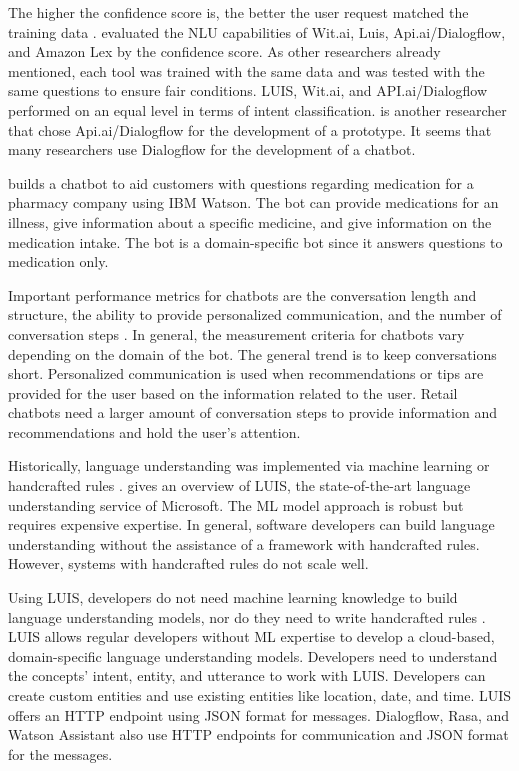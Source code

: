The higher the confidence score is, the better the user request matched the training data \cite{gregori2017evaluation}.
\citet{gregori2017evaluation} evaluated the NLU capabilities of Wit.ai, Luis, Api.ai/Dialogflow, and Amazon Lex\cite{lexconversational}
by the confidence score. 
As other researchers already mentioned, each tool was trained with the same data and was tested with the same questions to ensure fair conditions.
LUIS, Wit.ai, and API.ai/Dialogflow performed on an equal level in terms of intent classification.
\citet{gregori2017evaluation} is another researcher that chose Api.ai/Dialogflow for the development of a prototype.
It seems that many researchers use Dialogflow for the development of a chatbot.

\citet{pharmacybot} builds a chatbot to aid customers with questions regarding medication for a pharmacy company using IBM Watson.
The bot can provide medications for an illness, give information about a specific medicine, and give information on the medication intake.
The bot is a domain-specific bot since it answers questions to medication only.

Important performance metrics for chatbots are the conversation length and structure, the ability to provide personalized communication, and the number of conversation steps \cite{PRZEGALINSKA2019785}.
In general, the measurement criteria for chatbots vary depending on the domain of the bot.
The general trend is to keep conversations short.
Personalized communication is used when recommendations or tips are provided for the user based on the information related to the user.
Retail chatbots need a larger amount of conversation steps to provide information and recommendations and hold the user's attention.

Historically, language understanding was implemented via machine learning or handcrafted rules \cite{luis2015williams}.
\citet{luis2015williams} gives an overview of LUIS, the state-of-the-art language understanding service of Microsoft.
The ML model approach is robust but requires expensive expertise. 
In general, software developers can build language understanding without the assistance of a framework with handcrafted rules.
However, systems with handcrafted rules do not scale well.

Using LUIS, developers do not need machine learning knowledge to build language understanding models, nor do they need to write handcrafted rules \cite{luis2015williams}.
LUIS allows regular developers without ML expertise to develop a cloud-based, domain-specific language understanding models.
Developers need to understand the concepts' intent, entity, and utterance to work with LUIS.
Developers can create custom entities and use existing entities like location, date, and time.
LUIS offers an HTTP endpoint using JSON format for messages.
Dialogflow, Rasa, and Watson Assistant also use HTTP endpoints for communication and JSON format for the messages. 

